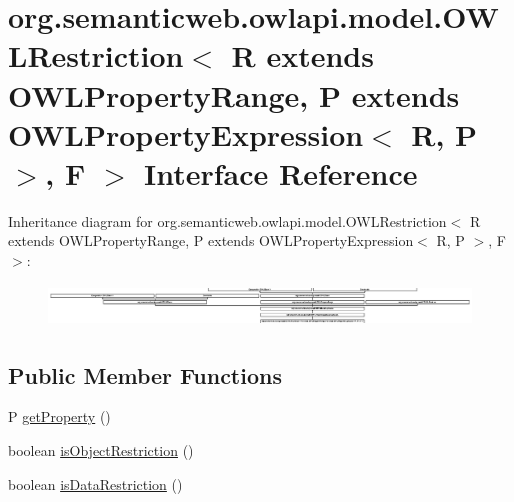 \hypertarget{interfaceorg_1_1semanticweb_1_1owlapi_1_1model_1_1_o_w_l_restriction_3_01_r_01extends_01_o_w_l_pe9e202d85055c07a1b3bb2521accae74}{\section{org.\-semanticweb.\-owlapi.\-model.\-O\-W\-L\-Restriction$<$ R extends O\-W\-L\-Property\-Range, P extends O\-W\-L\-Property\-Expression$<$ R, P $>$, F $>$ Interface Reference}
\label{interfaceorg_1_1semanticweb_1_1owlapi_1_1model_1_1_o_w_l_restriction_3_01_r_01extends_01_o_w_l_pe9e202d85055c07a1b3bb2521accae74}
}
Inheritance diagram for org.\-semanticweb.\-owlapi.\-model.\-O\-W\-L\-Restriction$<$ R extends O\-W\-L\-Property\-Range, P extends O\-W\-L\-Property\-Expression$<$ R, P $>$, F $>$\-:\begin{figure}[H]
\begin{center}
\leavevmode
\includegraphics[height=1.111111cm]{interfaceorg_1_1semanticweb_1_1owlapi_1_1model_1_1_o_w_l_restriction_3_01_r_01extends_01_o_w_l_pe9e202d85055c07a1b3bb2521accae74}
\end{center}
\end{figure}
\subsection*{Public Member Functions}
\begin{DoxyCompactItemize}
\item 
P \hyperlink{interfaceorg_1_1semanticweb_1_1owlapi_1_1model_1_1_o_w_l_restriction_3_01_r_01extends_01_o_w_l_pe9e202d85055c07a1b3bb2521accae74_acf66ce0a5a6058ccc77367fdf29b431e}{get\-Property} ()
\item 
boolean \hyperlink{interfaceorg_1_1semanticweb_1_1owlapi_1_1model_1_1_o_w_l_restriction_3_01_r_01extends_01_o_w_l_pe9e202d85055c07a1b3bb2521accae74_a8a254c78446e91fcf44b28edf18e6dcf}{is\-Object\-Restriction} ()
\item 
boolean \hyperlink{interfaceorg_1_1semanticweb_1_1owlapi_1_1model_1_1_o_w_l_restriction_3_01_r_01extends_01_o_w_l_pe9e202d85055c07a1b3bb2521accae74_a8ca097ffe2bcf531a5a101cb573a67a8}{is\-Data\-Restriction} ()
\end{DoxyCompactItemize}


